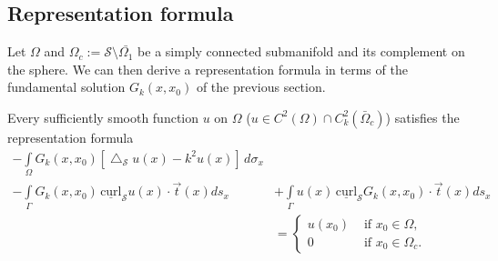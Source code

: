 \documentclass[final]{siamltex}
\newcommand{\lap}{\bigtriangleup}
\newcommand{\C}{C_k}
\renewcommand{\S} {\mathcal{S}}
\begin{document}
\subsection{Representation formula}
\label{s:representation}
Let $\Omega$ and $\Omega_c:=\S\setminus{\bar{\Omega_1}}$ be a simply
connected submanifold and its complement on the sphere. We can then
derive a representation formula in terms of the fundamental solution
$G_k(x,x_{0})$ of the previous section.
\begin{proposition}\label{prop:repr}
Every sufficiently smooth function $u$ on $\Omega$ ($u\in
C^2(\Omega)\cap\C^2(\bar{\Omega}_c) $) satisfies the representation
formula
\begin{align*}
 -  \int\limits_{\Omega}
G_k(x,x_{0})\left[\lap_{\S}u(x) -k^2 u(x)\right]\,d\sigma_x \\
-  \int\limits_{{\Gamma}} G_k(x,x_{0}) \, \underline{\mbox{curl}}_{\S} u(x) \cdot \vec{t}(x) ds_x&
 + \displaystyle\int\limits_{{\Gamma}}  u(x)
 \,\underline{\mbox{curl}}_{{\S}} G_k(x,x_0) \cdot \vec{t}(x) ds_x \\
&= \left\{ \begin{array}{ll} u(x_0) & \mbox{ if $x_0\in \Omega$},\\
				0 & \mbox{ if  $x_0\in{\Omega}_c$}. 
	\end{array} \right.
\end{align*}

\end{proposition}
\end{document}

